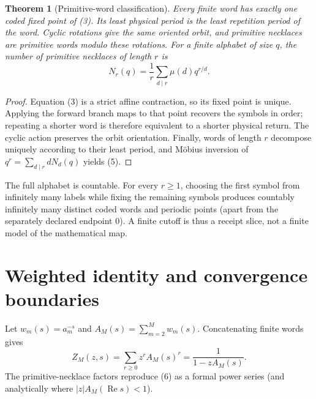\documentclass[10pt]{article}
\newtheorem{theorem}{Theorem}
\begin{document}
\begin{theorem}[Primitive-word classification]
Every finite word has exactly one coded fixed point of (3).  Its least physical
period is the least repetition period of the word.  Cyclic rotations give the
same oriented orbit, and primitive necklaces are primitive words modulo these
rotations.  For a finite alphabet of size $q$, the number of primitive
necklaces of length $r$ is
\begin{equation}
 N_r(q)=\frac1r\sum_{d\mid r}\mu(d)q^{r/d}.                       \tag{5}
\end{equation}
\end{theorem}
\begin{proof}
Equation (3) is a strict affine contraction, so its fixed point is unique.
Applying the forward branch maps to that point recovers the symbols in order;
repeating a shorter word is therefore equivalent to a shorter physical return.
The cyclic action preserves the orbit orientation.  Finally, words of length
$r$ decompose uniquely according to their least period, and M\"obius inversion
of $q^r=\sum_{d\mid r}dN_d(q)$ yields (5).
\end{proof}

The full alphabet is countable.  For every $r\ge1$, choosing the first symbol
from infinitely many labels while fixing the remaining symbols produces
countably infinitely many distinct coded words and periodic points (apart from
the separately declared endpoint $0$).  A finite cutoff is thus a receipt
slice, not a finite model of the mathematical map.

\section{Weighted identity and convergence boundaries}
Let $w_m(s)=a_m^{-s}$ and $A_M(s)=\sum_{m=2}^M w_m(s)$.  Concatenating finite
words gives
\begin{equation}
 Z_M(z,s)=\sum_{r\ge0}z^rA_M(s)^r
 =\frac{1}{1-zA_M(s)}.                                             \tag{6}
\end{equation}
The primitive-necklace factors reproduce (6) as a formal power series (and
analytically where $|z|A_M(\operatorname{Re}s)<1$).
\end{document}
